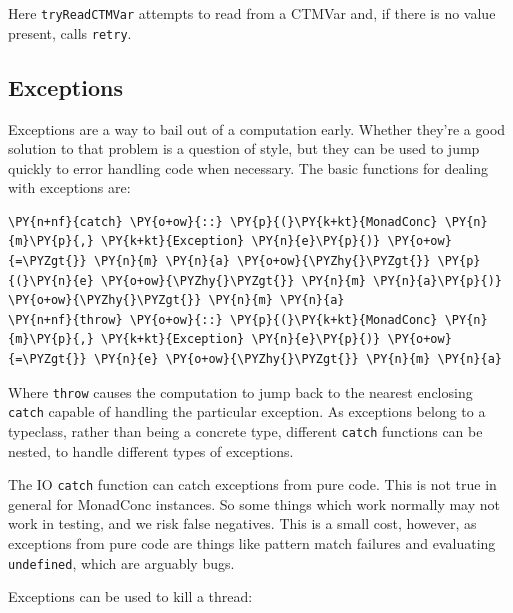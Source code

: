 Here \texttt{tryReadCTMVar} attempts to read from a CTMVar and, if
there is no value present, calls \texttt{retry}.

\subsection*{Exceptions}
\label{sec:dejafu-conc-excs}

Exceptions are a way to bail out of a computation early. Whether
they're a good solution to that problem is a question of style, but
they can be used to jump quickly to error handling code when
necessary. The basic functions for dealing with exceptions are:


\begin{Verbatim}[commandchars=\\\{\}]
\PY{n+nf}{catch} \PY{o+ow}{::} \PY{p}{(}\PY{k+kt}{MonadConc} \PY{n}{m}\PY{p}{,} \PY{k+kt}{Exception} \PY{n}{e}\PY{p}{)} \PY{o+ow}{=\PYZgt{}} \PY{n}{m} \PY{n}{a} \PY{o+ow}{\PYZhy{}\PYZgt{}} \PY{p}{(}\PY{n}{e} \PY{o+ow}{\PYZhy{}\PYZgt{}} \PY{n}{m} \PY{n}{a}\PY{p}{)} \PY{o+ow}{\PYZhy{}\PYZgt{}} \PY{n}{m} \PY{n}{a}
\PY{n+nf}{throw} \PY{o+ow}{::} \PY{p}{(}\PY{k+kt}{MonadConc} \PY{n}{m}\PY{p}{,} \PY{k+kt}{Exception} \PY{n}{e}\PY{p}{)} \PY{o+ow}{=\PYZgt{}} \PY{n}{e} \PY{o+ow}{\PYZhy{}\PYZgt{}} \PY{n}{m} \PY{n}{a}
\end{Verbatim}

Where \texttt{throw} causes the computation to jump back to the
nearest enclosing \texttt{catch} capable of handling the particular
exception. As exceptions belong to a typeclass, rather than being a
concrete type, different \texttt{catch} functions can be nested, to
handle different types of exceptions.

\begin{departure}
  The IO \texttt{catch} function can catch exceptions from pure
  code. This is not true in general for MonadConc instances.  So some
  things which work normally may not work in testing, and we risk
  false negatives. This is a small cost, however, as exceptions from
  pure code are things like pattern match failures and evaluating
  \texttt{undefined}, which are arguably bugs.
\end{departure}

Exceptions can be used to kill a thread:

